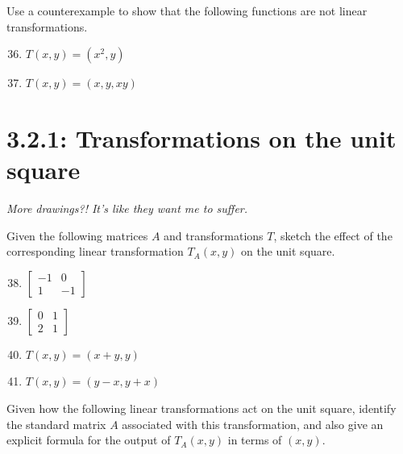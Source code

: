 \documentclass{article}
\begin{document}
\begin{center}
    \colorbox{CornflowerBlue!50}{
    \begin{minipage}[c]{0.9\textwidth}
        \centering
        Use a counterexample to show that the following functions are not linear transformations. 
    \end{minipage}
    }
\end{center}
\begin{enumerate}
    \setcounter{enumi}{35}
    \item \(T(x,y) = (x^2,y)\)
    \item \(T(x,y) = (x,y,xy)\)
\end{enumerate}
\pagebreak 

\section*{3.2.1: Transformations on the unit square}
\textit{More drawings?! It's like they want me to suffer. } 
\begin{center}
    \colorbox{CornflowerBlue!50}{
    \begin{minipage}[c]{0.9\textwidth}
        \centering
        Given the following matrices \(A\) and transformations \(T\), sketch the effect of the corresponding linear transformation \(T_A(x,y)\) on the unit square. 
    \end{minipage}
    }
\end{center}
\begin{enumerate}
    \setcounter{enumi}{37}
    \item \(\begin{bmatrix}
        -1&0 \\ 1&-1
    \end{bmatrix}\)
    \item \(\begin{bmatrix}
        0&1 \\ 2&1
    \end{bmatrix}\)
    \item \(T(x,y) = (x+y,y)\)
    \item \(T(x,y) = (y-x,y+x)\)
\end{enumerate}
\begin{center}
    \colorbox{CornflowerBlue!50}{
    \begin{minipage}[c]{0.9\textwidth}
        \centering
        Given how the following linear transformations act on the unit square, identify the standard matrix \(A\) associated with this transformation, and also give an explicit formula
        for the output of \(T_A(x,y)\) in terms of \((x,y)\). 
    \end{minipage}
    }
\end{center}
\end{document}
